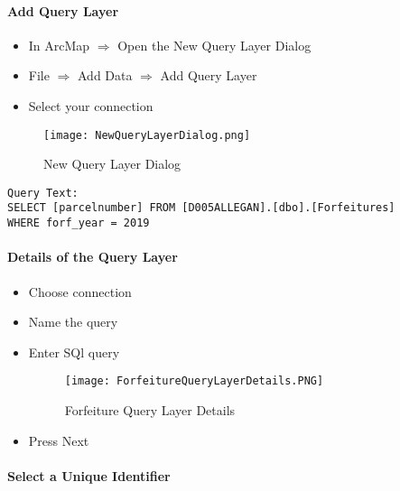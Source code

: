 \documentclass[class=book , crop=false, titlepage, twoside, multi={itemize, figure, verbatim}, float=false]{standalone}
\begin{document}
\clearpage
\paragraph[Add Query Layer]{Add Query Layer \texorpdfstring{\\}{}}
\vspace{.25in}

\begin{itemize}
\item In ArcMap $\Rightarrow$ {\Large Open the New Query Layer Dialog}
\item {\Large File $\Rightarrow$ Add Data $\Rightarrow$ Add Query Layer}
\item {\Large Select your connection}
\end{itemize}
\vspace{.25in}
%
%
\begin{figure}[h!]
\centering
    \texttt{[image: NewQueryLayerDialog.png]}
\caption{New Query Layer Dialog}
\end{figure}
\begin{verbatim}
Query Text:
SELECT [parcelnumber] FROM [D005ALLEGAN].[dbo].[Forfeitures]
WHERE forf_year = 2019
\end{verbatim}
\clearpage
\paragraph[Details of the Query Layer]{Details of the Query Layer \texorpdfstring{\\}{}}
\begin{itemize}
  \item Choose connection
  \item Name the query
  \item Enter SQl query
%
%
\begin{figure}[h!]
\centering
    \texttt{[image: ForfeitureQueryLayerDetails.PNG]}
\caption{Forfeiture Query Layer Details}
\end{figure}
%
\item Press Next
%
\end{itemize}
%
\clearpage
%
%
%
\paragraph[Select a Unique Identifier]{Select a Unique Identifier\texorpdfstring{\\}{}}
\end{document}

